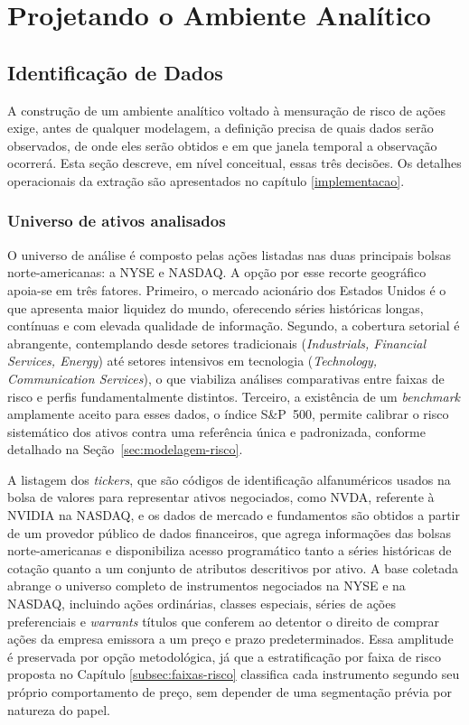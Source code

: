 \chapter{Projetando o Ambiente Analítico}
\label{metodologia}
\section{Identificação de Dados}
\label{coleta}

A construção de um ambiente analítico voltado à mensuração de risco de ações exige, antes de qualquer modelagem, a definição precisa de quais dados serão observados, de onde eles serão obtidos e em que janela temporal a observação ocorrerá. Esta seção descreve, em nível conceitual, essas três decisões. Os detalhes operacionais da extração são apresentados no capítulo \ref{implementacao}.

\subsection{Universo de ativos analisados}

O universo de análise é composto pelas ações listadas nas duas principais bolsas norte-americanas: a NYSE e NASDAQ. A opção por esse recorte geográfico apoia-se em três fatores. Primeiro, o mercado acionário dos Estados Unidos é o que apresenta maior liquidez do mundo, oferecendo séries históricas longas, contínuas e com elevada qualidade de informação. Segundo, a cobertura setorial é abrangente, contemplando desde setores tradicionais (\textit{Industrials, Financial Services, Energy}) até setores intensivos em tecnologia (\textit{Technology, Communication Services}), o que viabiliza análises comparativas entre faixas de risco e perfis fundamentalmente distintos. Terceiro, a existência de um \textit{benchmark} amplamente aceito para esses dados, o índice S\&P~500, permite calibrar o risco sistemático dos ativos contra uma referência única e padronizada, conforme detalhado na Seção~\ref{sec:modelagem-risco}.

A listagem dos \textit{tickers}, que são códigos de identificação alfanuméricos usados na bolsa de valores para representar ativos negociados, como NVDA, referente à NVIDIA na NASDAQ, e os dados de mercado e fundamentos são obtidos a partir de um provedor público de dados financeiros, que agrega informações das bolsas norte-americanas e disponibiliza acesso programático tanto a séries históricas de cotação quanto a um conjunto de atributos descritivos por ativo. A base coletada abrange o universo completo de instrumentos negociados na NYSE e na NASDAQ, incluindo ações ordinárias, classes especiais, séries de ações preferenciais e \textit{warrants} títulos que conferem ao detentor o direito de comprar ações da empresa emissora a um preço e prazo predeterminados. Essa amplitude é preservada por opção metodológica, já que a estratificação por faixa de risco proposta no Capítulo \ref{subsec:faixas-risco} classifica cada instrumento segundo seu próprio comportamento de preço, sem depender de uma segmentação prévia por natureza do papel.


